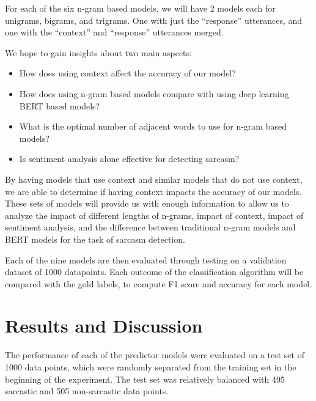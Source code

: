 \documentclass[11pt,a4paper]{article}
\begin{document}
For each of the six n-gram based models, we will have 2 models each for unigrams, bigrams, and trigrams. One with just the ``response'' utterances, and one with the ``context'' and
``response'' utterances merged. 

We hope to gain insights about two main aspects: 
\begin{itemize}
  \item How does using context affect the accuracy of our model?
  \item How does using n-gram based models compare with using deep learning BERT based models?
  \item What is the optimal number of adjacent words to use for n-gram based models?
  \item Is sentiment analysis alone effective for detecting sarcasm?
\end{itemize}

By having models that use context and similar models that do not use context, we are able to determine if having context impacts the accuracy of our models. These sets of models will provide us with enough information to allow us to analyze the impact of different lengths of n-grams, impact of context, impact of sentiment analysis, and the difference between traditional n-gram models and BERT models for the task of sarcasm detection.

Each of the nine models are then evaluated through testing on a validation dataset of 1000 datapoints. Each outcome of the classification algorithm will be compared with the gold labels, to compute F1 score and accuracy for each model. 

\section{Results and Discussion}
The performance of each of the predictor models were evaluated on a test set of 1000 data points, which were randomly separated from the training set in the beginning of the
experiment. The test set was relatively balanced with 495 sarcastic and 505 non-sarcastic data points. 
\end{document}
